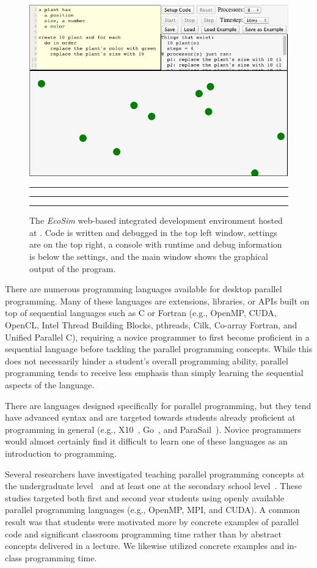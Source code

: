 \documentclass{sig-alternate}
\begin{document}
\begin{figure}
\centerline{\includegraphics[width=.49\textwidth]{figures/EcosimScreencap2}}
\hrule\vspace{-0.8em}
\caption{The \emph{EcoSim} web-based integrated development environment hosted at
\ecosimPath{}.  Code is written and debugged in the top left window, settings are on
the top right, a console with runtime and debug information is below the settings, and the
main window shows the graphical output of the program.}
\vspace*{0.2em}\hrule\hrule
\label{fig:ecosimScreencap}
\end{figure}



There are numerous programming languages available for desktop parallel programming.  Many of
these languages are extensions, libraries, or APIs built on top of sequential languages such 
as C or Fortran 
(e.g., OpenMP, CUDA, OpenCL, Intel Thread Building Blocks, pthreads, Cilk, Co-array Fortran, and Unified Parallel C),
requiring a novice programmer to first become proficient in a sequential language 
before tackling the parallel programming concepts.  
While this does not necessarily hinder a student's overall programming ability, 
parallel programming tends to receive less emphasis 
than simply learning the sequential aspects of the language.  

There are languages designed specifically for parallel programming, 
but they tend have advanced syntax 
and are targeted towards students already proficient at programming in general 
(e.g., X10~\cite{X10}, 
Go~\cite{GoLanguage}, and ParaSail~\cite{ParaSail}).  
Novice programmers would almost certainly find it difficult to learn one of these languages
as an introduction to programming.

Several researchers have investigated teaching parallel programming concepts 
at the undergraduate level~\cite{freshmanParallel,undergraduateParallel,gridPortal} 
and at least one at the secondary school level~\cite{highSchoolParallel}.
These studies targeted both first and second year students
using openly available parallel programming languages (e.g., OpenMP, MPI, and CUDA).
A common result was that students were motivated more by 
concrete examples of parallel code and significant classroom programming time 
rather than by abstract concepts delivered in a lecture.
We likewise utilized concrete examples and in-class programming time.
\end{document}
